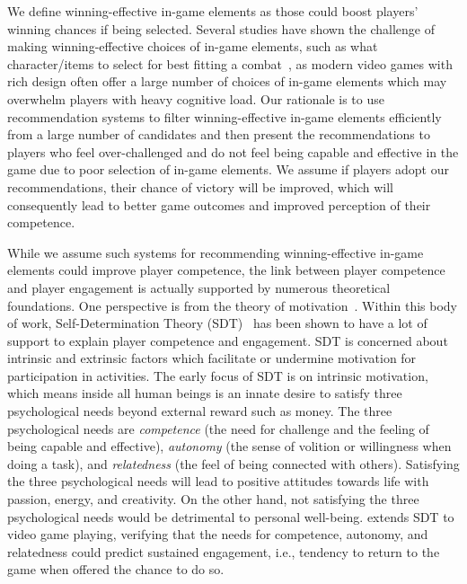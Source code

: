 We define winning-effective in-game elements as those could boost players' winning chances if being selected. Several studies have shown the challenge of making winning-effective choices of in-game elements, such as what character/items to select for best fitting a combat~\cite{looi2018recommender,summerville2017reco,hanke2017reco}, as modern video games with rich design often offer a large number of choices of in-game elements which may overwhelm players with heavy cognitive load. Our rationale is to use recommendation systems to filter winning-effective in-game elements efficiently from a large number of candidates and then present the recommendations to players who feel over-challenged and do not feel being capable and effective in the game due to poor selection of in-game elements. We assume if players adopt our recommendations, their chance of victory will be improved, which will consequently lead to better game outcomes and improved perception of their competence.  


While we assume such systems for recommending winning-effective in-game elements could improve player competence, the link between player competence and player engagement is actually supported by numerous theoretical foundations.
One perspective is from the theory of motivation~\cite{ryan2006motivational,przybylski2010motivational,yee2006motivations,wu2010falling,sherry2006video,lazzaro2004we,schoenau2011player}. Within this body of work, Self-Determination Theory (SDT)~\cite{ryan2000self} has been shown to have a lot of support to explain player competence and engagement. SDT is concerned about intrinsic and extrinsic factors which facilitate or undermine motivation for participation in activities. The early focus of SDT is on intrinsic motivation, which means inside all human beings is an innate desire to satisfy three psychological needs beyond external reward such as money. The three psychological needs are \textit{competence} (the need for challenge and the feeling of being capable and effective), \textit{autonomy} (the sense of volition or willingness when doing a task), and \textit{relatedness} (the feel of being connected with others). Satisfying the three psychological needs will lead to positive attitudes towards life with passion, energy, and creativity. On the other hand, not satisfying the three psychological needs would be detrimental to personal well-being. \cite{przybylski2010motivational,ryan2006motivational} extends SDT to video game playing, verifying that the needs for competence, autonomy, and relatedness could predict sustained engagement, i.e., tendency to return to the game when offered the chance to do so.


